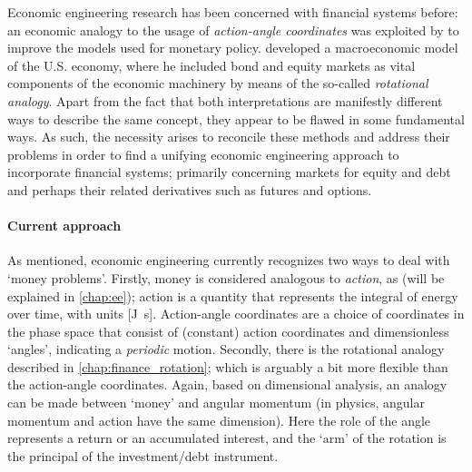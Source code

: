 Economic engineering research has been concerned with financial systems before: an economic analogy to the usage of 
\emph{action-angle coordinates} was exploited by \citet{Vos2019} to improve the models used for monetary policy. \citet{Kruimer2021} developed a macroeconomic model of the U.S. economy, where he included bond and equity markets as vital components of the economic machinery by means of the so-called \emph{rotational analogy}. Apart from the fact that both interpretations are manifestly different ways to describe the same concept, they appear to be flawed in some fundamental ways. As such, the necessity arises to reconcile these methods and address their problems in order to find a unifying economic engineering approach to incorporate financial systems; primarily concerning markets for equity and debt and perhaps their related derivatives such as futures and options. 

\paragraph{Current approach} As mentioned, economic engineering currently recognizes two ways to deal with 
`money problems'. Firstly, money is considered analogous to \emph{action}, as (will be explained in \cref{chap:ee}); action is a quantity that represents the integral of energy over time, with units [\si{\joule \second}]. Action-angle coordinates are a choice of coordinates in the phase space that consist of (constant) action coordinates and dimensionless `angles', indicating a \emph{periodic} motion. Secondly, there is the rotational analogy described in \cref{chap:finance_rotation}; which is arguably a bit more flexible than the action-angle coordinates. Again, based on dimensional analysis, an analogy can be made between `money' and angular momentum (in physics, angular momentum and action have the same dimension). Here the role of the angle represents a return or an accumulated interest, and the `arm' of the rotation is the principal of the investment/debt instrument.


